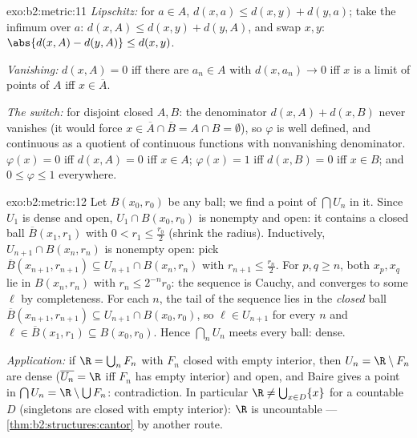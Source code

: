 \begin{solution}{exo:b2:metric:11}
\emph{Lipschitz:} for $a \in A$, $d(x, a) \leq d(x, y) + d(y,
a)$; take the infimum over $a$: $d(x, A) \leq d(x, y) + d(y,
A)$, and swap $x, y$: $\abs{d(x,A) - d(y,A)} \leq d(x,y)$.

\emph{Vanishing:} $d(x, A) = 0$ iff there are $a_n \in A$ with
$d(x, a_n) \to 0$ iff $x$ is a limit of points of $A$ iff $x \in
\overline A$.

\emph{The switch:} for disjoint closed $A, B$: the denominator
$d(x,A) + d(x,B)$ never vanishes (it would force $x \in \overline
A \cap \overline B = A \cap B = \emptyset$), so $\varphi$ is well
defined, and continuous as a quotient of continuous functions
with nonvanishing denominator. $\varphi(x) = 0$ iff $d(x, A) = 0$
iff $x \in A$; $\varphi(x) = 1$ iff $d(x, B) = 0$ iff $x \in B$;
and $0 \leq \varphi \leq 1$ everywhere.
\end{solution}

\begin{solution}{exo:b2:metric:12}
Let $B(x_0, r_0)$ be any ball; we find a point of $\bigcap U_n$
in it. Since $U_1$ is dense and open, $U_1 \cap B(x_0, r_0)$ is
nonempty and open: it contains a closed ball $\overline B(x_1,
r_1)$ with $0 < r_1 \leq \frac{r_0}2$ (shrink the radius).
Inductively, $U_{n+1} \cap B(x_n, r_n)$ is nonempty open: pick
$\overline B(x_{n+1}, r_{n+1}) \subseteq U_{n+1} \cap B(x_n,
r_n)$ with $r_{n+1} \leq \frac{r_n}2$. For $p, q \geq n$, both
$x_p, x_q$ lie in $B(x_n, r_n)$ with $r_n \leq 2^{-n}r_0$: the
sequence is Cauchy, and converges to some $\ell$ by
completeness. For each $n$, the tail of the sequence lies in the
\emph{closed} ball $\overline B(x_{n+1}, r_{n+1}) \subseteq U_{n+1}
\cap B(x_0, r_0)$, so $\ell \in U_{n+1}$ for every $n$ and $\ell
\in \overline B(x_1, r_1) \subseteq B(x_0, r_0)$. Hence
$\bigcap_n U_n$ meets every ball: dense.

\emph{Application:} if $\R = \bigcup_n F_n$ with $F_n$ closed
with empty interior, then $U_n = \R \setminus F_n$ are dense
($\overline{U_n} = \R$ iff $F_n$ has empty interior) and open,
and Baire gives a point in $\bigcap U_n = \R \setminus \bigcup
F_n$: contradiction. In particular $\R \neq \bigcup_{x \in D}
\{x\}$ for a countable $D$ (singletons are closed with empty
interior): $\R$ is uncountable ---
\cref{thm:b2:structures:cantor} by another route.
\end{solution}

